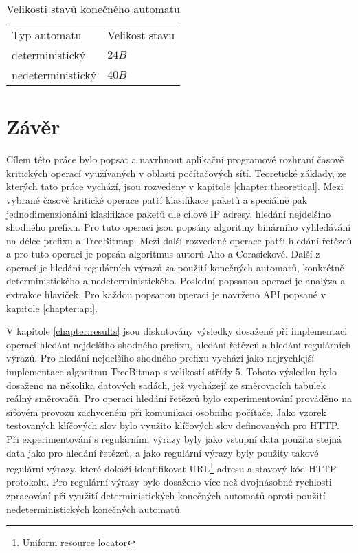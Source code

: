 \begin{table}[!htbp]
    \center
    \begin{tabular}{|l|l|}
    \hline
    Typ automatu & Velikost stavu\\ \hhline{|=|=|}
    deterministický  & $24B$\\ \hline
    nedeterministický & $40B$\\ \hline
    \end{tabular}
    \caption{Velikosti stavů konečného automatu}
    \label{tab:regex-size}
\end{table}

\chapter{Závěr}\label{chapter:conclusion} %
Cílem této práce bylo popsat a navrhnout aplikační programové rozhraní časově kritických operací využívaných v oblasti
počítačových sítí.
Teoretické základy, ze kterých tato práce vychází, jsou rozvedeny v kapitole \ref{chapter:theoretical}.
Mezi vybrané časově kritické operace patří klasifikace paketů a speciálně pak jednodimenzionální klasifikace paketů
dle cílové IP adresy, hledání nejdelšího shodného prefixu. Pro tuto operaci jsou popsány
algoritmy binárního vyhledávání na délce prefixu a TreeBitmap.
Mezi další rozvedené operace patří hledání řetězců a pro tuto operaci je popsán
algoritmus autorů Aho a Corasickové. Další z operací je hledání regulárních výrazů
za použití konečných automatů, konkrétně deterministického a nedeterministického.
Poslední popsanou operací je analýza a extrakce hlaviček.
Pro každou popsanou operaci je navrženo API popsané v kapitole \ref{chapter:api}.

V kapitole \ref{chapter:results} jsou diskutovány výsledky dosažené
při implementaci operací hledání nejdelšího shodného prefixu, hledání řetězců a hledání regulárních
výrazů. Pro hledání nejdelšího shodného prefixu vychází jako nejrychlejší implementace algoritmu
TreeBitmap s velikostí střídy 5. Tohoto výsledku bylo dosaženo na několika datových sadách,
jež vycházejí ze směrovacích tabulek reálný směrovačů.
Pro operaci hledání řetězců bylo experimentování prováděno na síťovém provozu zachyceném
při komunikaci osobního počítače. Jako vzorek
testovaných klíčových slov bylo využito klíčových slov definovaných pro HTTP.
Při experimentování s regulárními výrazy byly jako vstupní data použita stejná data jako pro hledání řetězců,
a jako regulární výrazy byly použity takové regulární výrazy, které dokáží identifikovat URL\footnote{Uniform resource locator} adresu a stavový kód HTTP protokolu. Pro regulární výrazy bylo dosaženo
více než dvojnásobné rychlosti zpracování při využití deterministických konečných automatů
oproti použití nedeterministických konečných automatů.

